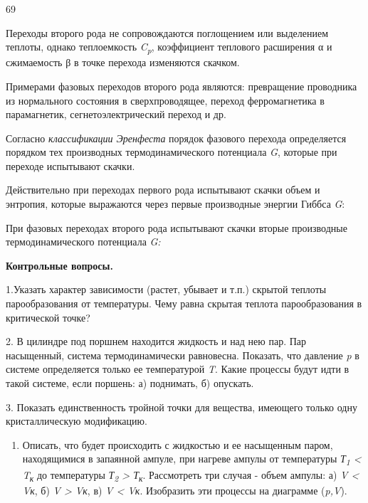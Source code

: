 69

Переходы второго рода не сопровождаются поглощением или выделением
теплоты, однако теплоемкость \emph{C\textsubscript{p}}, коэффициент
теплового расширения α и сжимаемость β в точке перехода изменяются
скачком.

Примерами фазовых переходов второго рода являются: превращение
проводника из нормального состояния в сверхпроводящее, переход
ферромагнетика в парамагнетик, сегнетоэлектрический переход и др.

Согласно \emph{классификации Эренфеста} порядок фазового перехода
определяется порядком тех производных термодинамического потенциала
\emph{G}, которые при переходе испытывают скачки.

Действительно при переходах первого рода испытывают скачки объем и
энтропия, которые выражаются через первые производные энергии Гиббса
\emph{G}:


При фазовых переходах второго рода испытывают скачки вторые производные
термодинамического потенциала \emph{G:}


\textbf{Контрольные вопросы.}

1.Указать характер зависимости (растет, убывает и т.п.) скрытой теплоты
парообразования от температуры. Чему равна скрытая теплота
парообразования в критической точке?

2. В цилиндре под поршнем находится жидкость и над нею пар. Пар
насыщенный, система термодинамически равновесна. Показать, что давление
\emph{p} в системе определяется только ее температурой \emph{T}. Какие
процессы будут идти в такой системе, если поршень: а) поднимать, б)
опускать.

3. Показать единственность тройной точки для вещества, имеющего только
одну кристаллическую модификацию.

\begin{enumerate}
\def\labelenumi{\arabic{enumi}.}
\setcounter{enumi}{3}
\item
  Описать, что будет происходить с жидкостью и ее насыщенным паром,
  находящимися в запаянной ампуле, при нагреве ампулы от температуры
  \emph{Т\textsubscript{1} \textless{} T\textsubscript{к}} до
  температуры \emph{Т\textsubscript{2} \textgreater{}
  Т\textsubscript{к}}. Рассмотреть три случая - объем ампулы: а) \emph{V
  \textless{} Vк}, б) \emph{V \textgreater{} Vк}, в) \emph{V \textless{}
  Vк}. Изобразить эти процессы на диаграмме (\emph{p,V}).
\end{enumerate}

